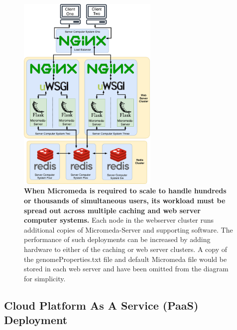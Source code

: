 \begin{figure}[!ht]
  \centering
	\includegraphics[width=0.60\textwidth]{media/micromeda-heavy-deployment.pdf}
	 \caption[When Micromeda is required to scale to handle hundreds or thousands 
of simultaneous users, its workload must be spread out across multiple caching 
and web server computer systems.]{\textbf{When Micromeda is required to scale to 
handle hundreds or thousands of simultaneous users, its workload must be spread 
out across multiple caching and web server computer systems.} Each node in the 
webserver cluster runs additional copies of Micromeda-Server and supporting 
software. The performance of such deployments can be increased by adding 
hardware to either of the caching or web server clusters.  A copy of the 
genomeProperties.txt file and default Micromeda file would be stored in each web 
server and have been omitted from the diagram for simplicity.}
	 \label{fig:micromeda-large-deploy}
\end{figure}

\subsection{Cloud Platform As A Service (PaaS) Deployment}

